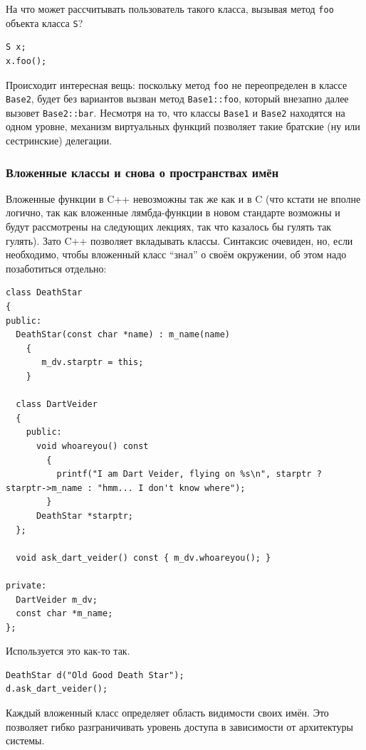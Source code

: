 \documentclass[a4paper,12pt,oneside]{article}
\begin{document}
На что может рассчитывать пользователь такого класса, вызывая метод \lstinline!foo! объекта класса \lstinline!S!?

\begin{lstlisting}
S x;
x.foo();
\end{lstlisting}

Происходит интересная вещь: поскольку метод \lstinline!foo! не переопределен в классе \lstinline!Base2!, будет без вариантов вызван метод \lstinline!Base1::foo!, который внезапно далее вызовет \lstinline!Base2::bar!. Несмотря на то, что классы \lstinline!Base1! и \lstinline!Base2! находятся на одном уровне, механизм виртуальных функций позволяет такие братские (ну или сестринские) делегации.

\subsubsection{Вложенные классы и снова о пространствах имён}\label{InnerClasses}

Вложенные функции в C++ невозможны так же как и в C (что кстати не вполне логично, так как вложенные лямбда-функции в новом стандарте возможны и будут рассмотрены на следующих лекциях, так что казалось бы гулять так гулять). Зато C++ позволяет вкладывать классы. Синтаксис очевиден, но, если необходимо, чтобы вложенный класс ``знал'' о своём окружении, об этом надо позаботиться отдельно:

\begin{lstlisting}
class DeathStar
{
public:
  DeathStar(const char *name) : m_name(name)
    {
       m_dv.starptr = this;
    }

  class DartVeider
  {
    public:
      void whoareyou() const
        {
          printf("I am Dart Veider, flying on %s\n", starptr ? starptr->m_name : "hmm... I don't know where");
        }
      DeathStar *starptr;    
  };

  void ask_dart_veider() const { m_dv.whoareyou(); }

private:
  DartVeider m_dv;
  const char *m_name;
};
\end{lstlisting}

Используется это как-то так.

\begin{lstlisting}
DeathStar d("Old Good Death Star");
d.ask_dart_veider();
\end{lstlisting}

Каждый вложенный класс определяет область видимости своих имён. Это позволяет гибко разграничивать уровень доступа в зависимости от архитектуры системы.
\end{document}
